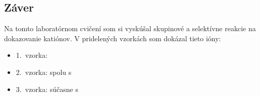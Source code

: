 \documentclass[paper=a4,fontsize=12pt]{scrartcl}
\begin{document}
\subsection*{Záver}
Na tomto laboratórnom cvičení som si vyskúšal skupinové a selektívne reakcie na
dokazovanie katiónov. V pridelených vzorkách som dokázal tieto ióny: \\
\begin{itemize}
    \item 1.~vzorka:  \\
    \item 2.~vzorka:  spolu s  \\
    \item 3.~vzorka:  súčasne s  
\end{itemize}
\end{document}
